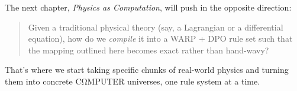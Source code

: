 The next chapter, \emph{Physics as Computation}, will push in the opposite direction:

\begin{quote}
Given a traditional physical theory (say, a Lagrangian or a differential equation),
how do we \emph{compile} it into a WARP + DPO rule set such that the mapping
outlined here becomes exact rather than hand-wavy?
\end{quote}

That’s where we start taking specific chunks of real-world physics and
turning them into concrete CΩMPUTER universes, one rule system at a time.
